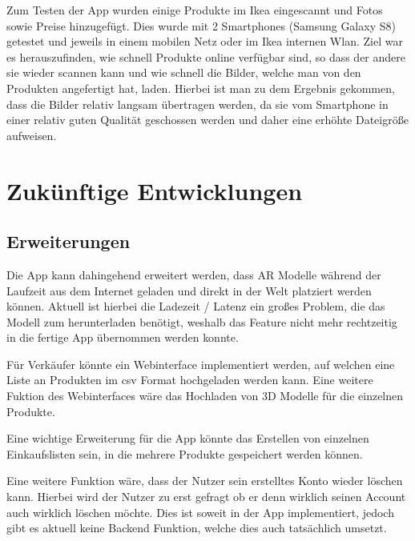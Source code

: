 \documentclass{scrartcl}
\begin{document}
Zum Testen der App wurden einige Produkte im Ikea eingescannt und Fotos sowie Preise hinzugefügt. Dies wurde mit 2 Smartphones (Samsung Galaxy S8) getestet und jeweils in einem mobilen Netz oder im Ikea internen Wlan. Ziel war es herauszufinden, wie schnell Produkte online verfügbar sind, so dass der andere sie wieder scannen kann und wie schnell die Bilder, welche man von den Produkten angefertigt hat, laden. Hierbei ist man zu dem Ergebnis gekommen, dass die Bilder relativ langsam übertragen werden, da sie vom Smartphone in einer relativ guten Qualität geschossen werden und daher eine erhöhte Dateigröße aufweisen.

\newpage

\section{Zukünftige Entwicklungen}

\subsection{Erweiterungen}

\noindent Die App kann dahingehend erweitert werden, dass AR Modelle während der Laufzeit aus dem Internet geladen und direkt in der Welt platziert werden können. Aktuell ist hierbei die Ladezeit / Latenz ein großes Problem, die das Modell zum herunterladen benötigt, weshalb das Feature nicht mehr rechtzeitig in die fertige App übernommen werden konnte. \newline 

\noindent Für Verkäufer könnte ein Webinterface implementiert werden, auf welchen eine Liste an Produkten im csv Format hochgeladen werden kann. Eine weitere Fuktion des Webinterfaces wäre das Hochladen von 3D Modelle für die einzelnen Produkte. \newline

\noindent Eine wichtige Erweiterung für die App könnte das Erstellen von einzelnen Einkaufslisten sein, in die mehrere Produkte gespeichert werden können. \newline 

\noindent Eine weitere Funktion wäre, dass der Nutzer sein erstelltes Konto wieder löschen kann. Hierbei wird der Nutzer zu erst gefragt ob er denn wirklich seinen Account auch wirklich löschen möchte. Dies ist soweit in der App implementiert, jedoch gibt es aktuell keine Backend Funktion, welche dies auch tatsächlich umsetzt. \newline 
\end{document}
